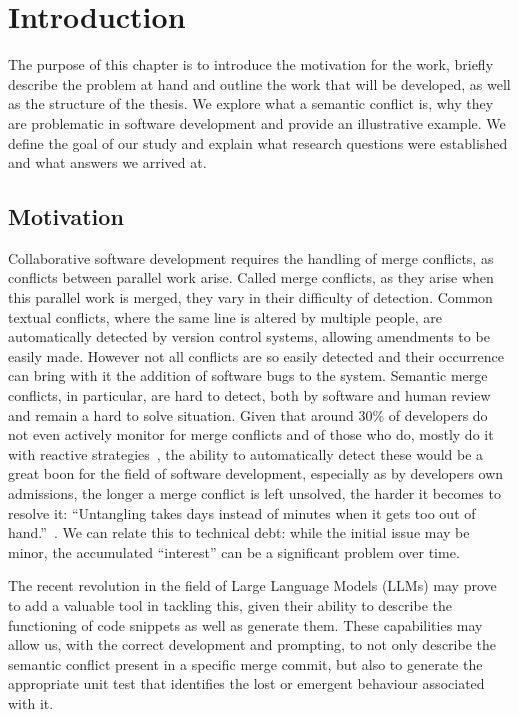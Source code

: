 \chapter{Introduction} \label{chap:intro}

The purpose of this chapter is to introduce the motivation for the work, briefly describe the problem at hand and outline the work that will be developed, as well as the structure of the thesis.
We explore what a semantic conflict is, why they are problematic in software development and provide an illustrative example.
We define the goal of our study and explain what research questions were established and what answers we arrived at.

\section{Motivation} \label{sec:motivation}

Collaborative software development requires the handling of merge conflicts, as conflicts between parallel work arise. Called merge conflicts, as they arise when this parallel work is merged, they vary in their difficulty of detection.
Common textual conflicts, where the same line is altered by multiple people, are automatically detected by version control systems, allowing amendments to be easily made. However not all conflicts are so easily detected and their occurrence can bring with it the addition of software bugs to the system. Semantic merge conflicts, in particular, are hard to detect, both by software and human review and remain a hard to solve situation. Given that around 30\% of developers do not even actively monitor for merge conflicts and of those who do, mostly do it with reactive strategies~\cite{kn:lifecycle}, the ability to automatically detect these would be a great boon for the field of software development, especially as by developers own admissions, the longer a merge conflict is left unsolved, the harder it becomes to resolve it: ``Untangling takes days instead of minutes when it gets too out of hand.''~\cite{kn:lifecycle}.
We can relate this to technical debt: while the initial issue may be minor, the accumulated ``interest'' can be a significant problem over time.

The recent revolution in the field of Large Language Models (LLMs) may prove to add a valuable tool in tackling this, given their ability to describe the functioning of code snippets as well as generate them. These capabilities may allow us, with the correct development and prompting, to not only describe the semantic conflict present in a specific merge commit, but also to generate the appropriate unit test that identifies the lost or emergent behaviour associated with it.


